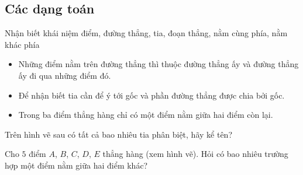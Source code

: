 \subsection{Các dạng toán}
\begin{dang}{Nhận biết khái niệm điểm, đường thẳng, tia, đoạn thẳng, nằm cùng phía, nằm khác phía}
\begin{itemize}
\item Những điểm nằm trên đường thẳng thì thuộc đường thẳng ấy và đường thẳng ấy đi qua những điểm đó.
\item Để nhận biết tia cần để ý tới gốc và phần đường thẳng được chia bởi gốc.
\item Trong ba điểm thẳng hàng chỉ có một điểm nằm giữa hai điểm còn lại.
\end{itemize}
\end{dang}
\begin{vd}%
Trên hình vẽ sau có tất cả bao nhiêu tia phân biệt, hãy kể tên?
\begin{center}
\end{center}
\end{vd}
\begin{vd}%
Cho $5$ điểm $A$, $B$, $C$, $D$, $E$ thẳng hàng (xem hình vẽ). Hỏi có bao nhiêu trường hợp một điểm nằm giữa hai điểm khác?
\begin{center}
\end{center}
\end{vd}

